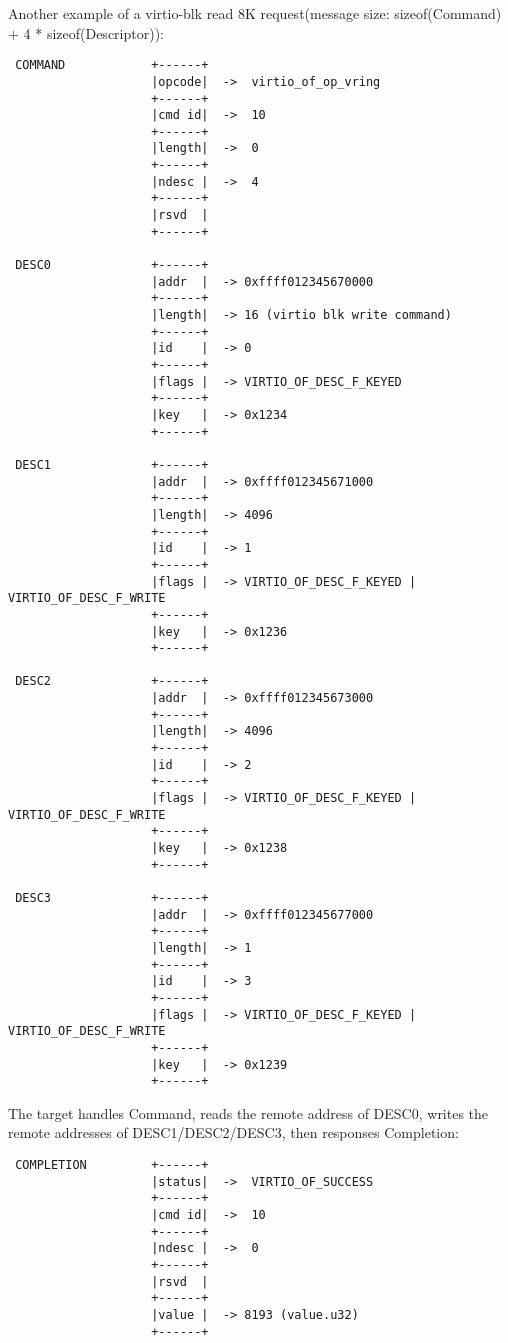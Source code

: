 Another example of a virtio-blk read 8K request(message size: sizeof(Command) +
4 * sizeof(Descriptor)):
\begin{lstlisting}
 COMMAND            +------+
                    |opcode|  ->  virtio_of_op_vring
                    +------+
                    |cmd id|  ->  10
                    +------+
                    |length|  ->  0
                    +------+
                    |ndesc |  ->  4
                    +------+
                    |rsvd  |
                    +------+

 DESC0              +------+
                    |addr  |  -> 0xffff012345670000
                    +------+
                    |length|  -> 16 (virtio blk write command)
                    +------+
                    |id    |  -> 0
                    +------+
                    |flags |  -> VIRTIO_OF_DESC_F_KEYED
                    +------+
                    |key   |  -> 0x1234
                    +------+

 DESC1              +------+
                    |addr  |  -> 0xffff012345671000
                    +------+
                    |length|  -> 4096
                    +------+
                    |id    |  -> 1
                    +------+
                    |flags |  -> VIRTIO_OF_DESC_F_KEYED | VIRTIO_OF_DESC_F_WRITE
                    +------+
                    |key   |  -> 0x1236
                    +------+

 DESC2              +------+
                    |addr  |  -> 0xffff012345673000
                    +------+
                    |length|  -> 4096
                    +------+
                    |id    |  -> 2
                    +------+
                    |flags |  -> VIRTIO_OF_DESC_F_KEYED | VIRTIO_OF_DESC_F_WRITE
                    +------+
                    |key   |  -> 0x1238
                    +------+

 DESC3              +------+
                    |addr  |  -> 0xffff012345677000
                    +------+
                    |length|  -> 1
                    +------+
                    |id    |  -> 3
                    +------+
                    |flags |  -> VIRTIO_OF_DESC_F_KEYED | VIRTIO_OF_DESC_F_WRITE
                    +------+
                    |key   |  -> 0x1239
                    +------+
\end{lstlisting}

The target handles Command, reads the remote address of DESC0, writes the remote
addresses of DESC1/DESC2/DESC3, then responses Completion:
\begin{lstlisting}
 COMPLETION         +------+
                    |status|  ->  VIRTIO_OF_SUCCESS
                    +------+
                    |cmd id|  ->  10
                    +------+
                    |ndesc |  ->  0
                    +------+
                    |rsvd  |
                    +------+
                    |value |  -> 8193 (value.u32)
                    +------+
\end{lstlisting}

